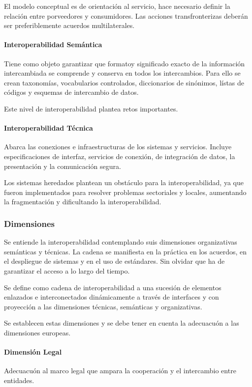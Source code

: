             El modelo conceptual es de orientación al servicio, hace necesario definir la relación entre porveedores y consumidores. Las acciones transfronterizas deberán ser preferiblemente acuerdos multilaterales.

        \paragraph{Interoperabilidad Semántica} %
            Tiene como objeto garantizar que formatoy significado exacto de la información intercambiada se comprende y conserva en todos los intercambios. Para ello se crean taxonomías, vocabularios controlados, diccionarios de sinónimos, lístas de códigos y esquemas de intercambio de datos.

            Este nivel de interoperabilidad plantea retos importantes.
        
        \paragraph{Interoperabilidad Técnica} %
            Abarca las conexiones e infraestructuras de los sistemas y servicios. Incluye especificaciones de interfaz, servicios de conexión, de integración de datos, la presentación y la comunicación segura. 

            Los sistemas heredados plantean un obstáculo para la interoperabilidad, ya que fueron implementados para resolver problemas sectoriales y locales, aumentando la fragmentación y dificultando la interoperabilidad.

    \subsubsection{Dimensiones} %
        Se entiende la interoperabilidad contemplando suis dimensiones organizativas semánticas y técnicas. La cadena se manifiesta en la práctica en los acuerdos, en el despliegue de sistemas y en el uso de estándares. Sin olvidar que ha de garantizar el acceso a lo largo del tiempo.

        Se define como cadena de interoperabilidad a una sucesión de elementos enlazados e interconectados dinámicamente a través de interfaces y con proyección a las dimensiones técnicas, semánticas y organizativas.

        Se establecen estas dimensiones y se debe tener en cuenta la adecuacuón a las dimensiones europeas.

        \paragraph{Dimensión Legal} %
            Adecuacuón al marco legal que ampara la cooperación y el intercambio entre entidades.

